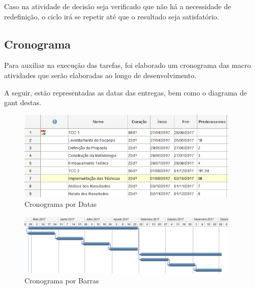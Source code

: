 Caso na atividade de decisão seja verificado que não há a necessidade de
redefinição, o ciclo irá se repetir até que o resultado seja satisfatório.

\subsection{Cronograma}
\label{sub:cronograma}
Para auxiliar na execução das tarefas, foi elaborado um cronograma
das macro atividades que serão elaboradas ao longo de desenvolvimento.

A seguir, estão representadas as datas das entregas, bem como o diagrama
de gant destas.

\begin{figure}[h]
    \centering
    \includegraphics[width=400px, scale=1]{figuras/cronogramadatas}
    \caption{Cronograma por Datas}
    \label{fig:cronogramadatas}
\end{figure}

\begin{figure}[h]
    \centering
    \includegraphics[width=400px, scale=1]{figuras/cronogramabarras}
    \caption{Cronograma por Barras}
    \label{fig:cronogramabarras}
\end{figure}

